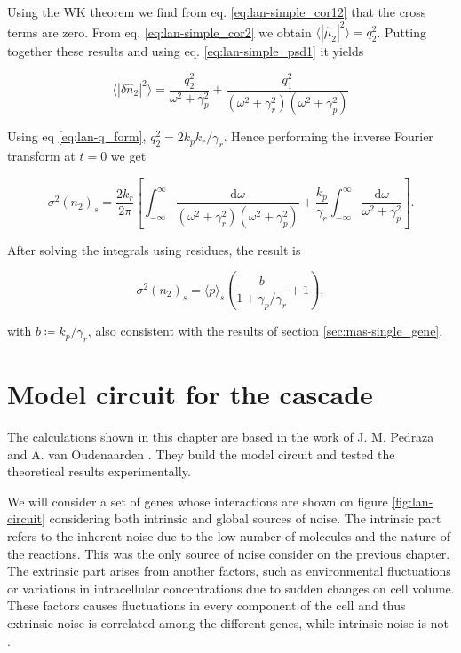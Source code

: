 Using the WK theorem we find from eq. \eqref{eq:lan-simple_cor12} that the cross terms are zero. From eq. \eqref{eq:lan-simple_cor2} we obtain $\langle|\hat{\mu}_2|^2\rangle = q_2^2$. Putting together these results and using eq. \eqref{eq:lan-simple_psd1} it yields

\begin{equation*}
  \langle|\delta\hat{n}_2|^2\rangle = \frac{q_2^2}{\omega^2+\gamma_p^2}+\frac{q_1^2}{(\omega^2+\gamma_r^2)(\omega^2+\gamma_p^2)}
\end{equation*}

Using eq \eqref{eq:lan-q_form}, $q_2^2 = 2k_pk_r/\gamma_r$. Hence performing the inverse Fourier transform at $t=0$ we get

\begin{equation*}
  \sigma^2(n_2)_s = \frac{2k_r}{2\pi}\left[\int_{-\infty}^\infty\frac{\mathrm{d}\omega}{(\omega^2+\gamma_r^2)(\omega^2+\gamma_p^2)} + \frac{k_p}{\gamma_r}\int_{-\infty}^\infty \frac{\mathrm{d}\omega}{\omega^2+\gamma_p^2} \right].
\end{equation*}

After solving the integrals using residues, the result is


\begin{equation*}
  \sigma^2(n_2)_s = \langle p\rangle_s\left(\frac{b}{1+\gamma_p/\gamma_r}+1\right),
\end{equation*}

with $b\coloneqq k_p/\gamma_r$, also consistent with the results of section \ref{sec:mas-single_gene}.

\section{Model circuit for the cascade}
The calculations shown in this chapter are based in the work of J. M. Pedraza and A. van Oudenaarden \cite{pedraza05}. They build the model circuit and tested the theoretical results experimentally. 


We will consider a set of genes whose interactions are shown on figure \ref{fig:lan-circuit} considering both intrinsic and global sources of noise. The intrinsic part refers to the inherent noise due to the low number of molecules and the nature of the reactions. This was the only source of noise consider on the previous chapter. The extrinsic part arises from another factors, such as environmental fluctuations or variations in intracellular concentrations due to sudden changes on cell volume. These factors causes fluctuations in every component of the cell and thus extrinsic noise is correlated among the different genes, while intrinsic noise is not \cite{elowitz02}.

